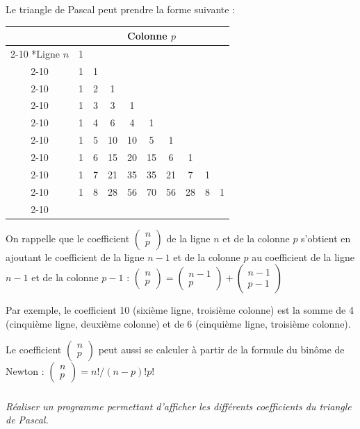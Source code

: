 \documentclass[10pt]{article}
\begin{document}
Le triangle de Pascal peut prendre la forme suivante :
\begin{center}
\begin{tabular}{c|c|c|c|c|c|c|c|c|c|}
\multicolumn{1}{c}{}& \multicolumn{9}{c}{Colonne $p$} \\
 \cline{2-10} 
\multirow{9}*{Ligne $n$} & 1 & & & & & & & & \\\cline{2-10} 
& 1 & 1& & & & & & & \\ \cline{2-10} 
& 1 & 2& 1& & & & & & \\ \cline{2-10} 
& 1 & 3& 3& 1& & & & & \\ \cline{2-10} 
& 1 & 4& 6& 4& 1& & & & \\ \cline{2-10} 
& 1 & 5& 10& 10& 5& 1& & & \\ \cline{2-10} 
& 1 & 6& 15& 20& 15& 6& 1& & \\ \cline{2-10} 
& 1 & 7& 21& 35& 35& 21& 7& 1& \\ \cline{2-10} 
& 1 & 8& 28& 56& 70& 56& 28& 8& 1\\ \cline{2-10} 
\end{tabular}
\end{center}


On rappelle que le coefficient $\begin{pmatrix} n \\ p \end{pmatrix}$ de la ligne $n$ et de la colonne $p$ s’obtient en ajoutant le coefficient de la ligne $n-1$ et de la colonne $p$ au coefficient de la ligne $n-1$ et de la colonne $p-1$ :
$\begin{pmatrix} n \\ p \end{pmatrix}
= \begin{pmatrix} n-1 \\ p \end{pmatrix} 
 + \begin{pmatrix} n-1 \\ p-1 \end{pmatrix} $

Par exemple, le coefficient 10 (sixième ligne, troisième colonne) est la somme de 4 (cinquième ligne, deuxième colonne) et de 6 (cinquième ligne, troisième colonne).

Le coefficient $\begin{pmatrix} n \\ p \end{pmatrix}$ peut aussi se calculer à partir de la formule du binôme de Newton : 
$\begin{pmatrix} n \\ p \end{pmatrix}=n!/(n-p)!p!$

\subparagraph*{}
\textit{Réaliser un programme permettant d’afficher les différents coefficients du triangle de Pascal.}
\end{document}
